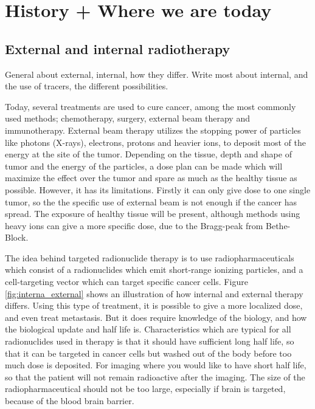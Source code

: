 \documentclass[a4paper,11pt,twoside]{book}
\begin{document}
\section{History + Where we are today}

\subsection{External and internal radiotherapy }
General about external, internal, how they differ. Write most about internal, and the use of tracers, the different possibilities. 


Today, several treatments are used to cure cancer, among the most commonly used methods; chemotherapy, surgery, external beam therapy and immunotherapy.  External beam therapy utilizes the stopping power of particles like photons (X-rays), electrons, protons and heavier ions, to deposit most of the energy at the site of the tumor. Depending on the tissue, depth and shape of tumor and the energy of the particles, a dose plan can be made which will maximize the effect over the tumor and spare as much as the healthy tissue as possible. However, it has its limitations. Firstly it can only give dose to one single tumor, so the the specific use of external beam is not enough if the cancer has spread. The exposure of healthy tissue will be present, although methods using heavy ions can give a more specific dose, due to the Bragg-peak from Bethe-Block. \newline

\noindent
The idea behind targeted radionuclide therapy is to use radiopharmaceuticals which consist of a radionuclides which emit short-range ionizing particles, and a cell-targeting vector which can target specific cancer cells. Figure \ref{fig:interna_external} shows an illustration of how internal and external therapy differs. Using this type of treatment, it is possible to give a more localized dose, and even treat metastasis. But it does require knowledge of the biology, and how the biological update and half life is. Characteristics which are typical for all radionuclides used in therapy is that it should have sufficient long half life, so that it can be targeted in cancer cells but washed out of the body before too much dose is deposited. For imaging  where you would like to have short half life, so that the patient will not remain radioactive after the imaging. The size of the radiopharmaceutical should not be too large, especially if brain is targeted, because of the blood brain barrier. 
\end{document}
